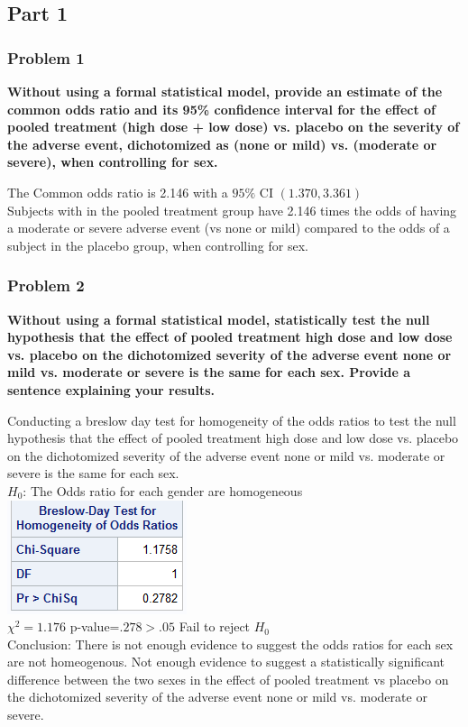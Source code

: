 \documentclass{article}
\begin{document}
\begin{flushleft}

\part*{Part 1}
\section*{Problem 1}
\textbf{Without using a formal statistical model, provide an estimate of the common odds ratio and its 95\%
confidence interval for the effect of pooled treatment (high dose + low dose) vs. placebo on the
severity of the adverse event, dichotomized as (none or mild) vs. (moderate or severe), when
controlling for sex.}\medbreak

The Common odds ratio is 2.146 with a $95\%$ CI $(1.370,3.361)$\\
Subjects with in the pooled treatment group have 2.146 times the odds of having a moderate or severe adverse event (vs none or mild) compared to the odds of a subject in the placebo group, when controlling for sex.
\pagebreak
\section*{Problem 2}
\textbf{Without using a formal statistical model, statistically test the null hypothesis that the effect of pooled
treatment high dose and low dose vs. placebo on the dichotomized severity of the adverse event none or mild vs. moderate or severe is the same for each sex. Provide a sentence explaining
your results.}\medbreak

Conducting a breslow day test for homogeneity of the odds ratios to test  the null hypothesis that the effect of pooled
treatment high dose and low dose vs. placebo on the dichotomized severity of the adverse event none or mild vs. moderate or severe is the same for each sex.\\
$H_0$: The Odds ratio for each gender are homogeneous \\
\includegraphics[scale=.6]{bday.png}\\
$\chi^2=1.176$ p-value=$.278>.05$ Fail to reject $H_0$\\
Conclusion: There is not enough evidence to suggest the odds ratios for each sex are not homeogenous. Not enough evidence to suggest a statistically significant difference between the two sexes in the effect of pooled treatment vs placebo on the dichotomized severity of the adverse event none or mild vs. moderate or severe.
\pagebreak

\end{flushleft}
\end{document}
